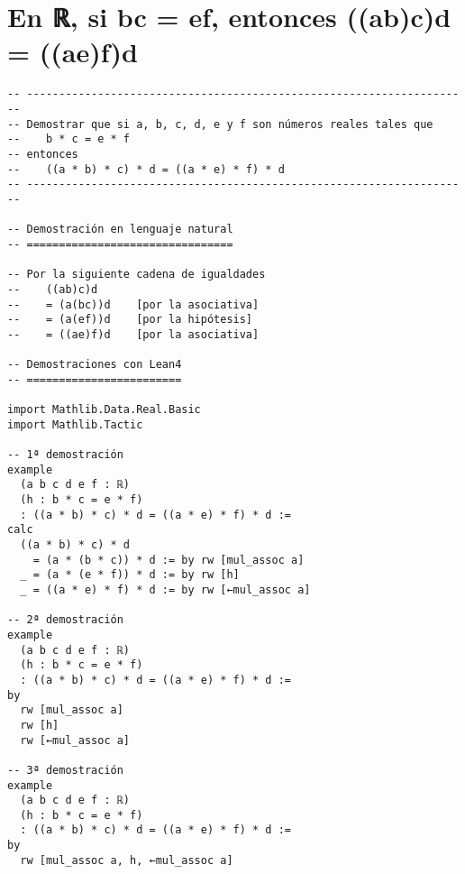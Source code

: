 \section{En ℝ, si bc = ef, entonces ((ab)c)d = ((ae)f)d}
\label{sec:org2748b80}
\begin{verbatim}
-- ---------------------------------------------------------------------
-- Demostrar que si a, b, c, d, e y f son números reales tales que
--    b * c = e * f
-- entonces
--    ((a * b) * c) * d = ((a * e) * f) * d
-- ---------------------------------------------------------------------

-- Demostración en lenguaje natural
-- ================================

-- Por la siguiente cadena de igualdades
--    ((ab)c)d
--    = (a(bc))d    [por la asociativa]
--    = (a(ef))d    [por la hipótesis]
--    = ((ae)f)d    [por la asociativa]

-- Demostraciones con Lean4
-- ========================

import Mathlib.Data.Real.Basic
import Mathlib.Tactic

-- 1ª demostración
example
  (a b c d e f : ℝ)
  (h : b * c = e * f)
  : ((a * b) * c) * d = ((a * e) * f) * d :=
calc
  ((a * b) * c) * d
    = (a * (b * c)) * d := by rw [mul_assoc a]
  _ = (a * (e * f)) * d := by rw [h]
  _ = ((a * e) * f) * d := by rw [←mul_assoc a]

-- 2ª demostración
example
  (a b c d e f : ℝ)
  (h : b * c = e * f)
  : ((a * b) * c) * d = ((a * e) * f) * d :=
by
  rw [mul_assoc a]
  rw [h]
  rw [←mul_assoc a]

-- 3ª demostración
example
  (a b c d e f : ℝ)
  (h : b * c = e * f)
  : ((a * b) * c) * d = ((a * e) * f) * d :=
by
  rw [mul_assoc a, h, ←mul_assoc a]
\end{verbatim}

